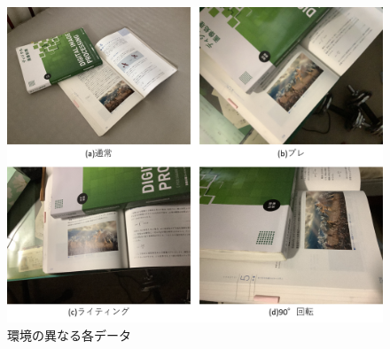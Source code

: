 \begin{figure}[h]
    \centering
    \includegraphics[width=1\linewidth]{fig/env_data.png}
    \caption{環境の異なる各データ}
    \label{fig:env_data}
\end{figure}

